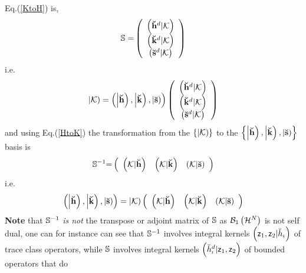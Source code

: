 Eq.(\ref{KtoH}) is, 
\begin{equation}
{\Bbb S=}\left( 
\begin{array}{c}
\left( {\bf \breve{h}}^{d}|{\cal K}\right) \\ 
\left( {\bf \breve{k}}^{d}|{\cal K}\right) \\ 
\left( {\bf \breve{s}}^{d}|{\cal K}\right)%
\end{array}%
\right)
\end{equation}%
i.e.%
\begin{equation}
\left| {\cal K}\right) =\left( \left| {\bf \breve{h}}\right) ,\left| {\bf 
\breve{k}}\right) ,\left| {\bf \breve{s}}\right) \right) \left( 
\begin{array}{c}
\left( {\bf \breve{h}}^{d}|{\cal K}\right) \\ 
\left( {\bf \breve{k}}^{d}|{\cal K}\right) \\ 
\left( {\bf \breve{s}}^{d}|{\cal K}\right)%
\end{array}%
\right)
\end{equation}%
and using Eq.(\ref{HtoK}) the transformation from the $\left\{ \left| {\cal K%
}\right) \right\} $ to the $\left\{ \left| {\bf \breve{h}}\right) ,\left| 
{\bf \breve{k}}\right) ,\left| {\bf \breve{s}}\right) \right\} $ basis is 
\begin{equation}
{\Bbb S}^{-1}{\Bbb =}\left( 
\begin{array}{ccc}
\left( {\cal K}|{\bf \breve{h}}\right) & \left( {\cal K}|{\bf \breve{k}}%
\right) & \left( {\cal K}|{\bf \breve{s}}\right)%
\end{array}%
\right)
\end{equation}%
i.e.%
\begin{equation}
\left( \left| {\bf \breve{h}}\right) ,\left| {\bf \breve{k}}\right) ,\left| 
{\bf \breve{s}}\right) \right) =\left| {\cal K}\right) \left( 
\begin{array}{ccc}
\left( {\cal K}|{\bf \breve{h}}\right) & \left( {\cal K}|{\bf \breve{k}}%
\right) & \left( {\cal K}|{\bf \breve{s}}\right)%
\end{array}%
\right)
\end{equation}%
{\bf Note }that ${\Bbb S}^{-1}$ {\it is not }the transpose or adjoint matrix
of ${\Bbb S}$ as ${\cal B}_{1}\left( {\cal H}^{N}\right) $ is not self dual,
one can for instance can see that ${\Bbb S}^{-1}$ involves integral kernels $%
\left( {\sf z}_{1},{\sf z}_{2}|\breve{h}_{\iota }\right) $ of trace class
operators, while ${\Bbb S}$ involves integral kernels $\left( \breve{h}%
_{\iota }^{d}|{\sf z}_{1},{\sf z}_{2}\right) $ of bounded operators that do
